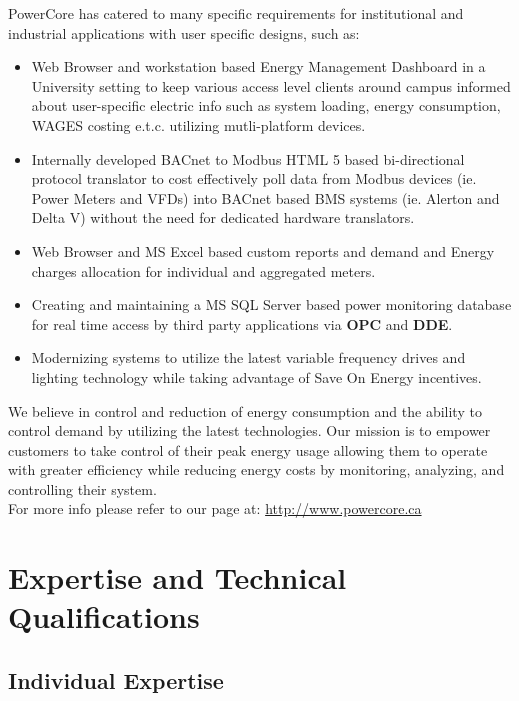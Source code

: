 PowerCore has catered to many specific requirements for institutional and industrial applications with user specific designs, such as:
\begin{itemize}
	\item Web Browser and workstation based Energy Management Dashboard in a University setting to keep various access level clients around campus informed about user-specific electric info such as system loading, energy consumption, WAGES costing e.t.c. utilizing mutli-platform devices.
	\item Internally developed BACnet to Modbus HTML 5 based bi-directional protocol translator to cost effectively poll data from Modbus devices (ie. Power Meters and VFDs) into BACnet based BMS systems (ie. Alerton and Delta V) without the need for dedicated hardware translators. 
	\item Web Browser and MS Excel based custom reports and demand and Energy charges allocation for individual and aggregated meters.
	\item Creating and maintaining a MS SQL Server based power monitoring database for real time access by third party applications via \textbf{OPC} and \textbf{DDE}.
	\item Modernizing systems to utilize the latest variable frequency drives and lighting technology while taking advantage of Save On Energy incentives.
\end{itemize}

We believe in control and reduction of energy consumption and the ability to control demand by utilizing the latest technologies. Our mission is to empower customers to take control of their peak energy usage allowing them to operate with greater efficiency while reducing energy costs by monitoring, analyzing, and controlling their system.\\


\noindent For more info please refer to our page at: \url{http://www.powercore.ca}\\

\pagebreak

\section{Expertise and Technical Qualifications}
\label{ETQ}

\subsection{Individual Expertise}
\label{ETQ:IndExp}

